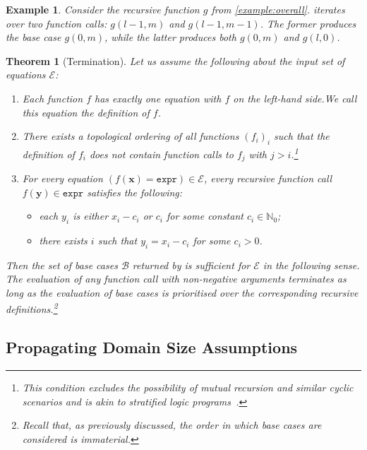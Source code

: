 \documentclass{article}
\newtheorem{theorem}{Theorem}
\newtheorem{example}{Example}
\theoremstyle{remark}
\newcommand{\expr}{\mathtt{expr}}
\begin{document}
\begin{example}
  Consider the recursive function $g$ from \cref{example:overall}.
   iterates over two function calls: $g(l-1, m)$
  and $g(l-1, m-1)$. The former produces the base case $g(0, m)$, while the
  latter produces both $g(0, m)$ and $g(l, 0)$.
\end{example}

\begin{theorem}[Termination]\label{thm:halting}
  Let us assume the following about the input set of equations $\mathcal{E}$:
  \begin{enumerate}
    \item Each function $f$ has exactly one equation with $f$ on the left-hand
          side.\@ We call this equation the \emph{definition} of $f$.
    \item There exists a topological ordering of all functions ${(f_{i})}_{i}$
          such that the definition of $f_{i}$ does not contain function calls to
          $f_{j}$ with $j > i$.\footnote{This condition excludes the possibility
          of mutual recursion and similar cyclic scenarios and is akin to
          stratified logic programs~\cite{DBLP:books/sp/Lloyd87}.}
    \item For every equation $(f(\mathbf{x}) = \expr) \in \mathcal{E}$, every
          recursive function call $f(\mathbf{y}) \in \expr$ satisfies the
          following:
          \begin{itemize}
            \item each $y_{i}$ is either $x_{i} - c_{i}$ or $c_{i}$ for some
                  constant $c_{i} \in \mathbb{N}_{0}$;
            \item there exists $i$ such that $y_{i} = x_{i} - c_{i}$ for some
                  $c_{i} > 0$.
          \end{itemize}
  \end{enumerate}
  Then the set of base cases $\mathcal{B}$ returned by
   is \emph{sufficient} for $\mathcal{E}$ in the
  following sense. The evaluation of any function call with non-negative
  arguments terminates as long as the evaluation of base cases is prioritised
  over the corresponding recursive definitions.\footnote{Recall that, as
    previously discussed, the order in which base cases are considered is
    immaterial.}
\end{theorem}

\subsection{Propagating Domain Size Assumptions}\label{sec:simplifying}
\end{document}
